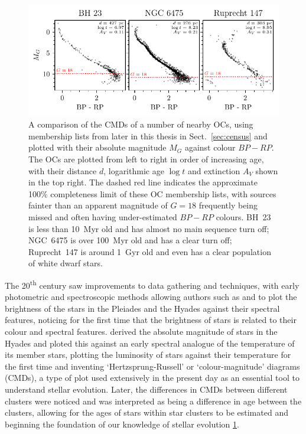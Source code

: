 \begin{figure}[tb]
	\includegraphics[width=\textwidth]{fig/c1/cmd_comparison.pdf}
	\caption[A comparison of the CMDs of a number of nearby OCs]{A comparison of the CMDs of a number of nearby OCs, using membership lists from later in this thesis in Sect.~\ref{sec:census} and plotted with their absolute magnitude $M_G$ against colour $BP - RP$. The OCs are plotted from left to right in order of increasing age, with their distance $d$, logarithmic age $\log t$ and extinction $A_V$ shown in the top right. The dashed red line indicates the approximate 100\% completeness limit of these OC membership lists, with sources fainter than an apparent magnitude of $G=18$ frequently being missed and often having under-estimated $BP-RP$ colours. BH~23 is less than 10~Myr old and has almost no main sequence turn off; NGC~6475 is over 100~Myr old and has a clear turn off; Ruprecht~147 is around 1~Gyr old and even has a clear population of white dwarf stars.}
	\label{fig:intro:history:cmds}
\end{figure}

The 20\textsuperscript{th} century saw improvements to data gathering and techniques, with early photometric and spectroscopic methods allowing authors such as \cite{rosenberg_uber_zusammenhang_1910} and \cite{hertzsprung_ueber_verwendung_1911} to plot the brightness of the stars in the Pleiades and the Hyades against their spectral features, noticing for the first time that the brightness of stars is related to their colour and spectral features. \cite{russell_relations_spectra_1914} derived the absolute magnitude of stars in the Hyades and ploted this against an early spectral analogue of the temperature of its member stars, plotting the luminosity of stars against their temperature for the first time and inventing `Hertzsprung-Russell' or `colour-magnitude' diagrams (CMDs), a type of plot used extensively in the present day as an essential tool to understand stellar evolution. Later, the differences in CMDs between different clusters were noticed and was interpreted as being a difference in age between the clusters, allowing for the ages of stars within star clusters to be estimated and beginning the foundation of our knowledge of stellar evolution \ref{fig:intro:history:cmds}.

